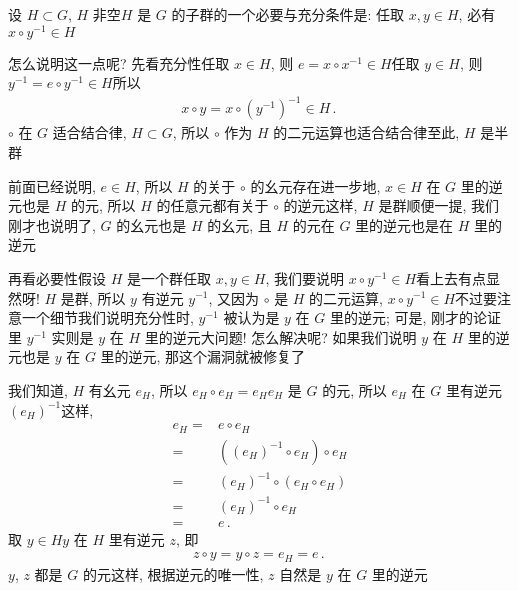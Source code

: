 \begin{remark}
    设 $H \subset G$, $H$ 非空\period $H$ 是 $G$ 的子群的一个必要与充分条件是: 任取 $x,y \in H$, 必有 $x \circ y^{-1} \in H$\period

    怎么说明这一点呢? 先看充分性\period 任取 $x \in H$, 则 $e = x \circ x^{-1} \in H$\period 任取 $y \in H$, 则 $y^{-1} = e \circ y^{-1} \in H$\period 所以
    \begin{align*}
        x \circ y = x \circ (y^{-1})^{-1} \in H \period
    \end{align*}
    $\circ$ 在 $G$ 适合结合律, $H \subset G$, 所以 $\circ$ 作为 $H$ 的二元运算也适合结合律\period 至此, $H$ 是半群\period

    前面已经说明, $e \in H$, 所以 $H$ 的关于 $\circ$ 的幺元存在\period 进一步地, $x \in H$ 在 $G$ 里的逆元也是 $H$ 的元, 所以 $H$ 的任意元都有关于 $\circ$ 的逆元\period 这样, $H$ 是群\period 顺便一提, 我们刚才也说明了, $G$ 的幺元也是 $H$ 的幺元, 且 $H$ 的元在 $G$ 里的逆元也是在 $H$ 里的逆元\period

    再看必要性\period 假设 $H$ 是一个群\period 任取 $x,y \in H$, 我们要说明 $x \circ y^{-1} \in H$\period 看上去有点显然呀! $H$ 是群, 所以 $y$ 有逆元 $y^{-1}$, 又因为 $\circ$ 是 $H$ 的二元运算, $x \circ y^{-1} \in H$\period 不过要注意一个细节\period 我们说明充分性时, $y^{-1}$ 被认为是 $y$ 在 $G$ 里的逆元; 可是, 刚才的论证里 $y^{-1}$ 实则是 $y$ 在 $H$ 里的逆元\period 大问题! 怎么解决呢? 如果我们说明 $y$ 在 $H$ 里的逆元也是 $y$ 在 $G$ 里的逆元, 那这个漏洞就被修复了\period

    我们知道, $H$ 有幺元 $e_H$, 所以 $e_H \circ e_H = e_H$\period $e_H$ 是 $G$ 的元, 所以 $e_H$ 在 $G$ 里有逆元 $(e_H)^{-1}$\period 这样,
    \begin{align*}
        e_H
        = {} & e \circ e_H                      \\
        = {} & ((e_H)^{-1} \circ e_H) \circ e_H \\
        = {} & (e_H)^{-1} \circ (e_H \circ e_H) \\
        = {} & (e_H)^{-1} \circ e_H             \\
        = {} & e \period
    \end{align*}
    取 $y \in H$\period $y$ 在 $H$ 里有逆元 $z$, 即
    \begin{align*}
        z \circ y = y \circ z = e_H = e\period
    \end{align*}
    $y$, $z$ 都是 $G$ 的元\period 这样, 根据逆元的唯一性, $z$ 自然是 $y$ 在 $G$ 里的逆元\period
\end{remark}

